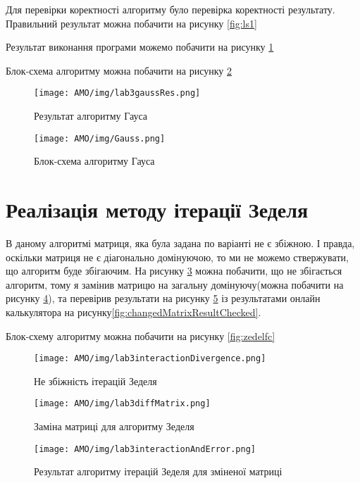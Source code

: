 \documentclass{article}
\begin{document}
Для перевірки коректності алгоритму було перевірка коректності результату. Правильний результат можна побачити на рисунку \ref{fig:ls1}

Результат виконання програми можемо побачити на рисунку \ref{fig:gauss}

Блок-схема алгоритму можна побачити на рисунку \ref{fig:gaussfc}

\begin{figure}
\centering
\texttt{[image: AMO/img/lab3gaussRes.png]}
\caption{Результат алгоритму Гауса}
\label{fig:gauss}
\end{figure}

\begin{figure}
\centering
\texttt{[image: AMO/img/Gauss.png]}
\caption{Блок-схема алгоритму Гауса}
\label{fig:gaussfc}
\end{figure}

\section{Реалізація методу ітерації Зеделя}

В даному алгоритмі матриця, яка була задана по варіанті не є збіжною. І правда, оскільки матриця не є діагонально домінуючою, то ми не можемо ствержувати, що алгоритм буде збігаючим. На рисунку \ref{fig:zedelDivergence} можна побачити, що не збігається алгоритм, тому я замінив матрицю на загальну домінуючу(можна побачити на рисунку \ref{fig:matrixChange}), та перевірив результати на рисунку \ref{fig:chandedMatrixResult} із результатами онлайн калькулятора на рисунку\ref{fig:changedMatrixResultChecked}.

Блок-схему алгоритму можна побачити на рисунку \ref{fig:zedelfc}

\begin{figure}
\centering
\texttt{[image: AMO/img/lab3interactionDivergence.png]}
\caption{Не збіжність ітерацій Зеделя}
\label{fig:zedelDivergence}
\end{figure}

\begin{figure}
\centering
\texttt{[image: AMO/img/lab3diffMatrix.png]}
\caption{Заміна матриці для алгоритму Зеделя}
\label{fig:matrixChange}
\end{figure}

\begin{figure}
\centering
\texttt{[image: AMO/img/lab3interactionAndError.png]}
\caption{Результат алгоритму ітерацій Зеделя для зміненої матриці}
\label{fig:chandedMatrixResult}
\end{figure}
\end{document}
